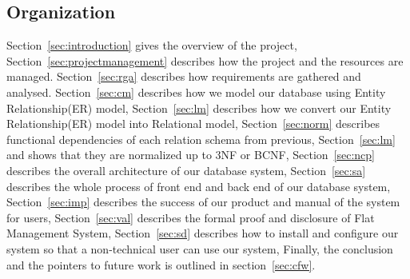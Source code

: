 \subsection{Organization}  Section~\ref{sec:introduction} gives the overview of the project, Section~\ref{sec:projectmanagement} describes how the project and the resources are managed.
Section~\ref{sec:rga} describes how requirements are gathered and analysed.
Section~\ref{sec:cm} describes how we model our database using Entity Relationship(ER) model, Section~\ref{sec:lm} describes how we convert
our Entity Relationship(ER) model into Relational model, Section~\ref{sec:norm} describes functional dependencies of each relation schema from previous, Section~\ref{sec:lm} and shows that
they are normalized up to 3NF or BCNF, Section~\ref{sec:ncp} describes the overall
architecture of our database system, Section~\ref{sec:sa} describes the whole process of front end and back end of our database system, Section~\ref{sec:imp} describes the success of our product and manual of the system for users, Section~\ref{sec:val} describes the formal proof and disclosure of Flat  Management System, Section~\ref{sec:sd} describes how to install and configure our system so that a non-technical user can use
our system, Finally, the conclusion and the pointers to future work is outlined in section~\ref{sec:cfw}.

\clearpage